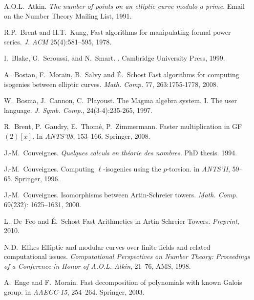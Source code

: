 
\begin{thebibliography}{AAAA00}

  A.O.L.~Atkin.
  \newblock \emph{The number of points on an elliptic curve modulo a prime}.
  \newblock Email on the Number Theory Mailing List, 1991.

R.P.~Brent and H.T.~Kung, Fast algorithms for
  manipulating formal power series.  \emph{J. ACM} 25(4):581--595, 1978.

  I.~Blake, G.~Seroussi, and N.~Smart.
  .
  \newblock Cambridge University Press, 1999.

  A.~Bostan, F.~Morain, B.~Salvy and É.~Schost
  \newblock Fast algorithms for computing isogenies between elliptic curves.
  \newblock \emph{Math. Comp.} 77, 263:1755-1778, 2008.

  W.~Bosma, J.~Cannon, C.~Playoust.
  \newblock The Magma algebra system. I. The user language.
  \newblock \emph{J. Symb. Comp.}, 24(3-4):235-265, 1997.
  
  R.~Brent, P.~Gaudry, E.~Thom{\'e}, P.~Zimmermann.
  \newblock Faster multi\-plication in GF$(2)[x]$.
  \newblock In {\em ANTS'08}, 153--166. Springer, 2008.

  J.-M.~Couveignes.
  \newblock \emph{Quelques calculs en théorie des nombres}.
  \newblock PhD thesis. 1994.

  J.-M.~Couveignes. 
  \newblock Computing {$\ell$}-isogenies using the {$p$}-torsion.
  \newblock in {\em ANTS'II}, 59--65. Springer, 1996.

  J.-M.~Couveignes. 
  \newblock Isomorphisms between {A}rtin-{S}chreier towers. 
  \newblock \emph{Math. Comp.} 69(232): 1625--1631, 2000.
  
  L.~De~Feo and \'E.~Schost
  \newblock Fast Arithmetics in Artin Schreier Towers.
  \newblock \emph{Preprint}, 2010.

  N.D.~Elikes
  \newblock Elliptic and modular curves over finite fields and related computational issues.
  \newblock \emph{Computational Perspectives on Number Theory: Proceedings of a Conference in Honor of A.O.L. Atkin}, 21--76, AMS, 1998. 

  A.~Enge and F.~Morain.
  \newblock Fast decomposition of polynomials with known Galois group.
  \newblock in {\em AAECC-15}, 254--264. Springer, 2003.


\end{thebibliography}
